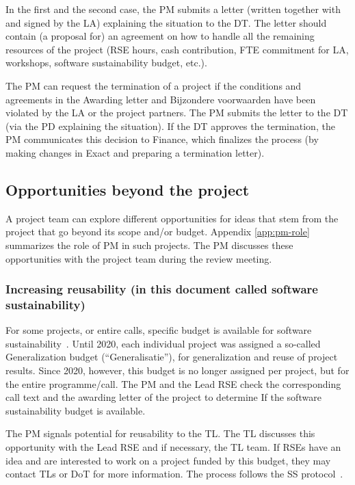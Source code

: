 In the first and the second case, the PM submits a letter (written together with and signed by the LA) explaining the
situation to the DT. The letter should contain (a proposal for) an agreement on how to handle all the remaining
resources of the project (RSE hours, cash contribution, FTE commitment for LA, workshops, software sustainability
budget, etc.). 

The PM can request the termination of a project if the conditions and agreements in the Awarding letter and Bijzondere
voorwaarden have been violated by the LA or the project partners. The PM submits the letter to the DT (via the PD
explaining the situation). If the DT approves the termination, the PM communicates this decision to Finance, which
finalizes the process (by making changes in Exact and preparing a termination letter).

\subsection{Opportunities beyond the project}
\label{sec:opportunities}
A project team can explore different opportunities for ideas that stem from the project that go beyond its scope and/or
budget. Appendix \ref{app:pm-role} summarizes the role of PM in such projects. The PM discusses these opportunities with the project
team during the review meeting.


\subsubsection{Increasing reusability (in this document called software sustainability)}
\label{sec:opportunities:ss}
For some projects, or entire calls, specific budget is available for software sustainability~\cite{nlesc2024software}. Until 2020, each
individual project was assigned a so-called Generalization budget (“Generalisatie”), for generalization and reuse of
project results. Since 2020, however, this budget is no longer assigned per project, but for the entire programme/call.
The PM and the Lead RSE check the corresponding call text and the awarding letter of the project to determine If the
software sustainability budget is available.

The PM signals potential for reusability to the TL. The TL discusses this opportunity with the Lead RSE and if
necessary, the TL team. If RSEs have an idea and are interested to work on a project funded by this budget, they may
contact TLs or DoT for more information. The process follows the SS protocol~\cite{intranet}.

